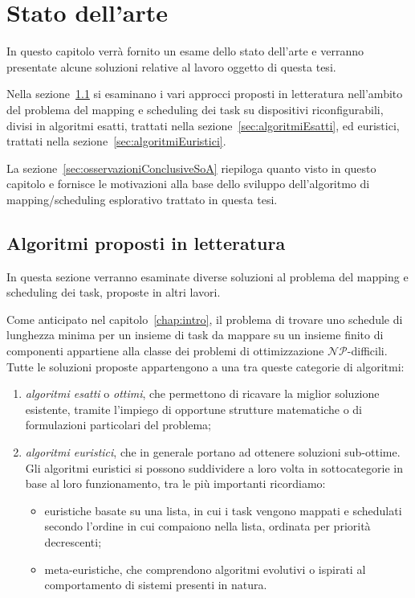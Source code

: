 \chapter{Stato dell'arte}
\label{chap:SOA}
\vspace{1cm}
In questo capitolo verrà fornito un esame dello stato dell'arte e verranno presentate 
alcune soluzioni relative al lavoro oggetto di questa tesi.

Nella sezione~\ref{sec:algoritmiProposti} si esaminano i vari approcci proposti 
in letteratura nell'ambito del problema del mapping e scheduling dei task su dispositivi 
riconfigurabili, divisi in algoritmi esatti, trattati nella
sezione~\ref{sec:algoritmiEsatti}, ed euristici, trattati nella
sezione~\ref{sec:algoritmiEuristici}.

La sezione~\ref{sec:osservazioniConclusiveSoA} riepiloga quanto visto in questo capitolo
e fornisce le motivazioni alla base dello sviluppo dell'algoritmo di mapping/scheduling
esplorativo trattato in questa tesi.

\newpage

\section{Algoritmi proposti in letteratura}
\label{sec:algoritmiProposti}
In questa sezione verranno esaminate diverse soluzioni al problema del
mapping e scheduling dei task, proposte in altri lavori.

Come anticipato nel capitolo~\ref{chap:intro}, il problema di trovare uno 
schedule di lunghezza minima per un insieme di task da mappare su un insieme finito
di componenti appartiene alla classe dei problemi di ottimizzazione 
$\mathcal{NP}$-difficili. Tutte le soluzioni proposte appartengono a una 
tra queste categorie di algoritmi:
\begin{enumerate}
 \item \emph{algoritmi esatti} o \emph{ottimi}, che permettono di ricavare la 
miglior soluzione esistente, tramite l'impiego di opportune strutture matematiche o di 
formulazioni particolari del problema;
 \item \emph{algoritmi euristici}, che in generale portano ad ottenere 
soluzioni sub-ottime. Gli algoritmi euristici si possono suddividere a loro 
volta in sottocategorie in base al loro funzionamento, tra le più importanti 
ricordiamo:
 \begin{itemize}
  \item euristiche basate su una lista, in cui i task vengono mappati e schedulati 
secondo l'ordine in cui compaiono nella lista, ordinata per priorità decrescenti;
  \item meta-euristiche, che comprendono algoritmi evolutivi o ispirati al 
comportamento di sistemi presenti in natura.
 \end{itemize}
\end{enumerate}

